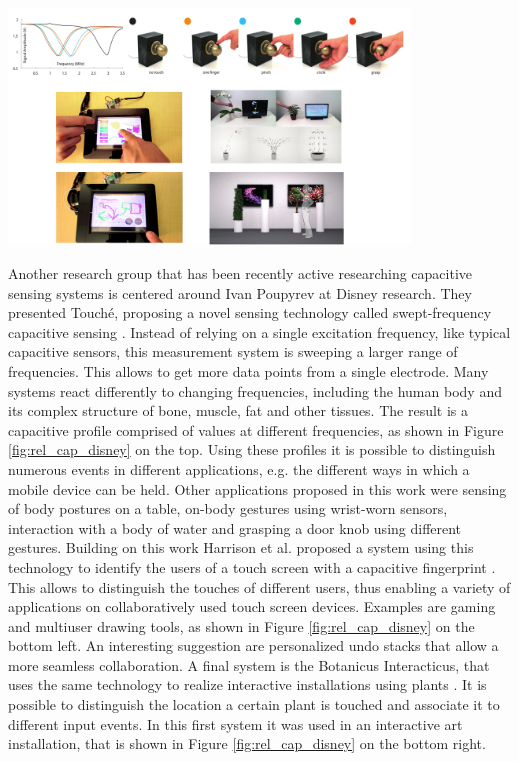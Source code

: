 \begin{minipage}{\linewidth}
\centering
\includegraphics[width=0.8\textwidth]{images/rel_cap_disney}
\label{fig:rel_cap_disney}
\end{minipage}

Another research group that has been recently active researching capacitive sensing systems is centered around Ivan Poupyrev at Disney research. They presented Touché, proposing a novel sensing technology called swept-frequency capacitive sensing \cite{Sato2012}. Instead of relying on a single excitation frequency, like typical capacitive sensors, this measurement system is sweeping a larger range of frequencies. This allows to get more data points from a single electrode. Many systems react differently to changing frequencies, including the human body and its complex structure of bone, muscle, fat and other tissues. The result is a capacitive profile comprised of values at different frequencies, as shown in Figure \ref{fig:rel_cap_disney} on the top. Using these profiles it is possible to distinguish numerous events in different applications, e.g. the different ways in which a mobile device can be held. Other applications proposed in this work were sensing of body postures on a table, on-body gestures using wrist-worn sensors, interaction with a body of water and grasping a door knob using different gestures. Building on this work Harrison et al. proposed a system using this technology to identify the users of a touch screen with a capacitive fingerprint \cite{harrison2012capacitive}. This allows to distinguish the touches of different users, thus enabling a variety of applications on collaboratively used touch screen devices. Examples are gaming and multiuser drawing tools, as shown in Figure \ref{fig:rel_cap_disney} on the bottom left. An interesting suggestion are personalized undo stacks that allow a more seamless collaboration. A final system is the Botanicus Interacticus, that uses the same technology to realize interactive installations using plants  \cite{poupyrev2012botanicus}. It is possible to distinguish the location a certain plant is touched and associate it to different input events. In this first system it was used in an interactive art installation, that is shown in Figure \ref{fig:rel_cap_disney} on the bottom right.

